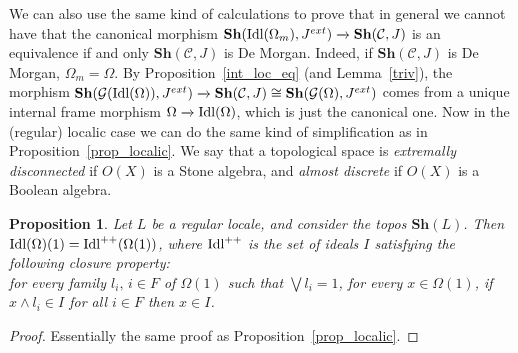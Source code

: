 \documentclass{article}
\newtheorem{proposition}[theorem]{Proposition}
\begin{document}
We can also use the same kind of calculations to prove that in general we cannot have that the canonical morphism $\mathbf{Sh}(\textup{Idl}(\Omega_m),J^{ext})\xrightarrow{}\mathbf{Sh}(\mathcal{C},J)$ is an equivalence if and only $\mathbf{Sh}(\mathcal{C},J)$ is De Morgan. Indeed, if $\mathbf{Sh}(\mathcal{C},J)$ is De Morgan, $\Omega_m=\Omega$. By Proposition~\ref{int_loc_eq} (and Lemma~\ref{triv}), the morphism $\mathbf{Sh}(\mathcal{G}(\textup{Idl}(\Omega)),J^{ext})\xrightarrow{}\mathbf{Sh}(\mathcal{C},J)\cong \mathbf{Sh}(\mathcal{G}(\Omega),J^{ext})$ comes from a unique internal frame morphism $\Omega\xrightarrow{}\textup{Idl}(\Omega)$, which is just the canonical one. Now in the (regular) localic case we can do the same kind of simplification as in Proposition~\ref{prop_localic}. We say that a topological space is \emph{extremally disconnected} if $O(X)$ is a Stone algebra, and \emph{almost discrete} if $O(X)$ is a Boolean algebra.
\begin{proposition}\label{prop_localic2}
    Let $L$ be a regular locale, and consider the topos $\mathbf{Sh}(L)$. Then $\textup{Idl}(\Omega)(1)=\textup{Idl}^{++}(\Omega(1))$, where $\textup{Idl}^{++}$ is the set of ideals $I$ satisfying the following closure property:\\
    for every family $l_i,\,i\in F$ of $\Omega(1)$ such that $\bigvee l_i=1$, for every $x\in \Omega(1)$, if $x\land l_i\in I$ for all $i\in F$ then $x\in I$.
\end{proposition}
\begin{proof}
    Essentially the same proof as Proposition~\ref{prop_localic}.
\end{proof}
\end{document}

